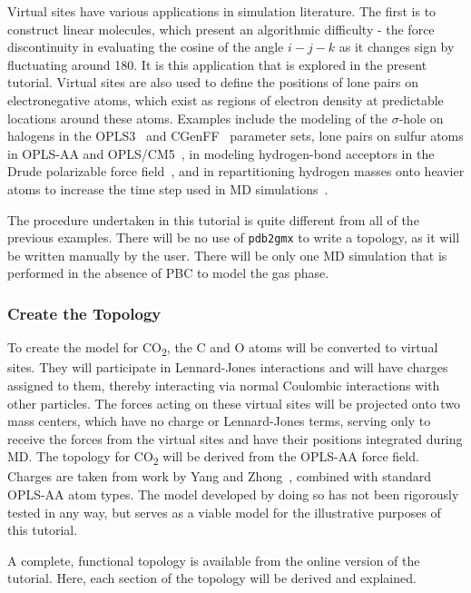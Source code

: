\documentclass[9pt,tutorial]{livecoms}
\begin{document}
Virtual sites have various applications in simulation literature. The first is to construct linear molecules, which present an algorithmic difficulty - the force discontinuity in evaluating the cosine of the angle $i-j-k$ as it changes sign by fluctuating around 180\textdegree. It is this application that is explored in the present tutorial. Virtual sites are also used to define the positions of lone pairs on electronegative atoms, which exist as regions of electron density at predictable locations around these atoms. Examples include the modeling of the $\sigma$-hole on halogens in the OPLS3~\cite{Harder2016} and CGenFF~\cite{Gutierrez2016} parameter sets, lone pairs on sulfur atoms in OPLS-AA and OPLS/CM5~\cite{Yan2017}, in modeling hydrogen-bond acceptors in the Drude polarizable force field~\cite{Harder2006,Lemkul2016}, and in repartitioning hydrogen masses onto heavier atoms to increase the time step used in MD simulations~\cite{Feenstra1999,Bjelkmar2010}.

The procedure undertaken in this tutorial is quite different from all of the previous examples. There will be no use of \texttt{pdb2gmx} to write a topology, as it will be written manually by the user. There will be only one MD simulation that is performed in the absence of PBC to model the gas phase.

\subsubsection{Create the Topology} \label{vsite_top}

To create the model for CO\textsubscript{2}, the C and O atoms will be converted to virtual sites. They will participate in Lennard-Jones interactions and will have charges assigned to them, thereby interacting via normal Coulombic interactions with other particles. The forces acting on these virtual sites will be projected onto two mass centers, which have no charge or Lennard-Jones terms, serving only to receive the forces from the virtual sites and have their positions integrated during MD. The topology for CO\textsubscript{2} will be derived from the OPLS-AA force field. Charges are taken from work by Yang and Zhong~\cite{Yang2006}, combined with standard OPLS-AA atom types. The model developed by doing so has not been rigorously tested in any way, but serves as a viable model for the illustrative purposes of this tutorial.

A complete, functional topology is available from the online version of the tutorial. Here, each section of the topology will be derived and explained.
\end{document}
